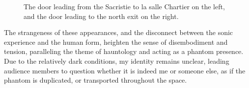 \documentclass[12pt,twoside,maitrise]{dms_ks}
\theoremstyle{definition}
\begin{document}
{{\begin{figure}[h]
    \centering
    \caption{The door leading from the Sacristie to la salle Chartier on the left, and the door leading to the north exit on the right.}
    \label{fig:chartier}
\end{figure}

The strangeness of these appearances, and the disconnect between the sonic experience and the human form, heighten the sense of disembodiment and tension, paralleling the theme of hauntology and acting as a phantom presence. 
Due to the relatively dark conditions, my identity remains unclear, leading audience members to question whether it is indeed me or someone else, as if the phantom is duplicated, or transported throughout the space.

}}
\end{document}
